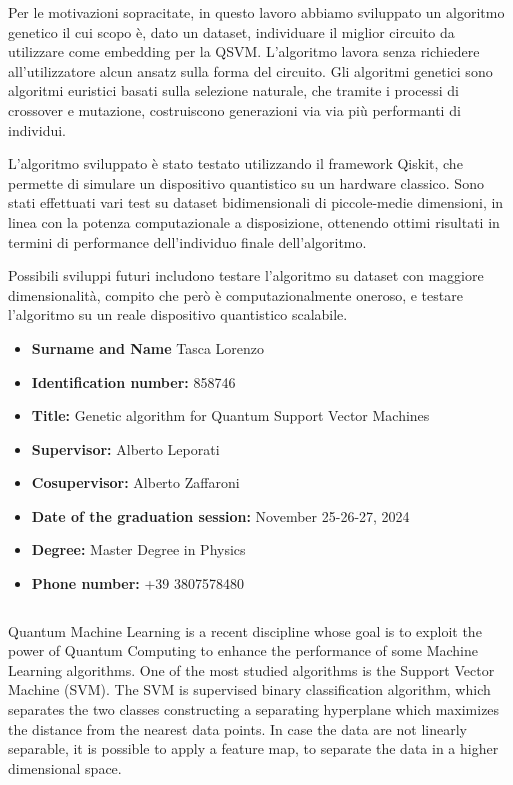\documentclass{article}
\begin{document}
Per le motivazioni sopracitate, in questo lavoro abbiamo sviluppato un algoritmo genetico il cui scopo è, dato un dataset, individuare il miglior circuito da utilizzare come embedding per la QSVM. L'algoritmo lavora senza richiedere all'utilizzatore alcun ansatz sulla forma del circuito. Gli algoritmi genetici sono algoritmi euristici basati sulla selezione naturale, che tramite i processi di crossover e mutazione, costruiscono generazioni via via più performanti di individui. 

L'algoritmo sviluppato è stato testato utilizzando il framework Qiskit, che permette di simulare un dispositivo quantistico su un hardware classico. Sono stati effettuati vari test su dataset bidimensionali di piccole-medie dimensioni, in linea con la potenza computazionale a disposizione, ottenendo ottimi risultati in termini di performance dell'individuo finale dell'algoritmo.

Possibili sviluppi futuri includono testare l'algoritmo su dataset con maggiore dimensionalità, compito che però è computazionalmente oneroso, e testare l'algoritmo su un reale dispositivo quantistico scalabile.





\newpage
\begin{itemize}
    \item \textbf{Surname  and Name} Tasca Lorenzo
    \item \textbf{Identification number:} 858746
    \item \textbf{Title:} Genetic algorithm for Quantum Support Vector Machines    
    \item \textbf{Supervisor:} Alberto Leporati
    \item \textbf{Cosupervisor:} Alberto Zaffaroni
    \item \textbf{Date of the graduation session:} November 25-26-27, 2024
    \item \textbf{Degree:} Master Degree in Physics
    \item \textbf{Phone number:} +39 3807578480
    
\end{itemize}
$\,$

Quantum Machine Learning is a recent discipline whose goal is to exploit the power of Quantum Computing to enhance the performance of some Machine Learning algorithms. One of the most studied algorithms is the Support Vector Machine (SVM). The SVM is supervised binary classification algorithm, which separates the two classes constructing a separating hyperplane which maximizes the distance from the nearest data points. In case the data are not linearly separable, it is possible to apply a feature map, to separate the data in a higher dimensional space. 
\end{document}
